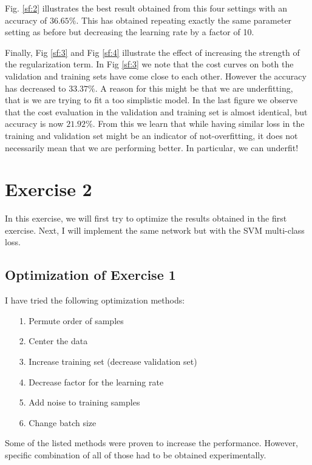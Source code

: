 \documentclass[journal, a4paper]{IEEEtran}
\begin{document}
Fig. \ref{sf:2} illustrates the best result obtained from this four settings with an accuracy of $36.65 \%$. This has obtained repeating exactly the same parameter setting as before but decreasing the learning rate by a factor of 10.

Finally, Fig \ref{sf:3} and Fig \ref{sf:4} illustrate the effect of increasing the strength of the regularization term. In Fig \ref{sf:3} we note that the cost curves on both the validation and training sets have come close to each other. However the accuracy has decreased to $33.37 \%$. A reason for this might be that we are underfitting, that is we are trying to fit a too simplistic model. In the last figure we observe that the cost evaluation in the validation and training set is almost identical, but accuracy is now $21.92 \%$. From this we learn that while having similar loss in the training and validation set might be an indicator of not-overfitting, it does not necessarily mean that we are performing better. In particular, we can underfit!


\section{Exercise 2} \label{sec:2}

In this exercise, we will first try to optimize the results obtained in the first exercise. Next, I will implement the same network but with the SVM multi-class loss.

\subsection{Optimization of Exercise 1}

I have tried the following optimization methods:

\begin{itemize}
\item[1.] Permute order of samples
\item[2.] Center the data
\item[3.] Increase training set (decrease validation set)
\item[4.] Decrease factor for the learning rate
\item[5.] Add noise to training samples
\item[6.] Change batch size
\end{itemize}


Some of the listed methods were proven to increase the performance. However, specific combination of all of those had to be obtained experimentally. \\
\end{document}
